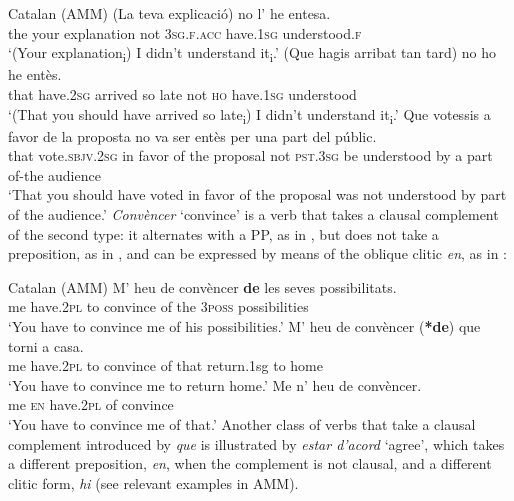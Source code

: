 \documentclass[output=paper,hidelinks]{langscibook}
\begin{document}
\ea\label{ex:Romance:36} Catalan (AMM)
\ea\label{ex:Romance:36a}
\gll (La teva explicació) no l' he entesa.\\
       the your explanation not \textsc{3sg.f.acc} have.\textsc{1sg} understood.\textsc{f}\\
\glt   `(Your explanation\textsubscript{i}) I didn't understand it\textsubscript{i}.'
\ex\label{ex:Romance:36b}
\gll
 (Que hagis arribat tan tard) no ho he entès.\\
       that have.2\textsc{sg} arrived so late not \textsc{ho} have.1\textsc{sg} understood\\
\glt   `(That you should have arrived so late\textsubscript{i}) I
didn't understand it\textsubscript{i}.'
\ex\label{ex:Romance:36c}
\gll
Que votessis a favor de la proposta no va ser entès per una part del públic.\\
       that vote.\textsc{sbjv}.\textsc{2sg} in favor of the proposal not \textsc{pst}.3\textsc{sg} be understood by a part of-the audience\\
\glt   `That you should have voted in favor of the proposal was not
understood by part of the audience.'
\z\z
\textit{Convèncer} `convince' is a verb that takes a clausal complement of the second type: it alternates with a PP, as in , but does not take a preposition, as in , and can be expressed by means of the oblique clitic \textit{en}, as in :

\ea\label{ex:Romance:37} Catalan (AMM)
\ea\label{ex:Romance:37a}
\gll M' heu de convèncer \textbf{de} les seves possibilitats.\\
       me have.\textsc{2pl} to convince of the 3\textsc{poss} possibilities\\
\glt   `You have to convince me of his possibilities.'
\ex\label{ex:Romance:37b}
\gll
 M' heu de convèncer (\textbf{*de}) que torni a casa.\\
       me have.2\textsc{pl} to convince of that return.1sg to home\\
\glt   `You have to convince me to return home.'
\ex\label{ex:Romance:37c}
\gll
Me n' heu de convèncer.\\
me \textsc{en} have.2\textsc{pl} of convince\\
\glt   `You have to convince me of that.'
\z\z
Another class of verbs that take a clausal complement introduced by \textit{que} is illustrated by \textit{estar d'acord} `agree', which takes a different preposition, \textit{en}, when the complement is not clausal, and a different clitic form, \textit{hi} (see relevant examples in AMM). 
\end{document}
